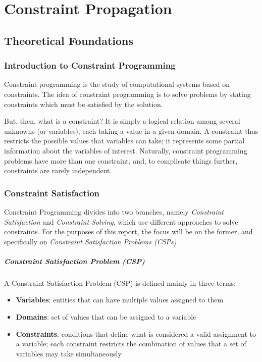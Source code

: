 \chapter{Constraint Propagation}

\section{Theoretical Foundations}

\subsection{Introduction to Constraint Programming}

Constraint programming is the study of computational systems based on constraints. The idea of constraint programming is to solve problems by stating constraints which must be satisfied by the solution.
\par
But, then, what is a constraint? It is simply a logical relation among several unknowns (or variables), each taking a value in a given domain. A constraint thus restricts the possible values that variables can take; it represents some partial information about the variables of interest.
Naturally, constraint programming problems have more than one constraint, and, to complicate things further, constraints are rarely independent.

\subsection{Constraint Satisfaction}

Constraint Programming divides into two branches, namely \textit{Constraint Satisfaction} and \textit{Constraint Solving}, which use different approaches to solve constraints. For the purposes of this report, the focus will be on the former, and specifically on \textit{Constraint Satisfaction Problems (CSPs)}

\paragraph{Constraint Satisfaction Problem (CSP)} A Constraint Satisfaction Problem (CSP) is defined mainly in three terms:

\begin{itemize}
    \item \textbf{Variables}: entities that can have multiple values assigned to them
    \item \textbf{Domains}: set of values that can be assigned to a variable
    \item \textbf{Constraints}: conditions that define what is considered a valid assignment to a variable; each constraint restricts the combination of values that a set of variables may take simultaneously
\end{itemize}

